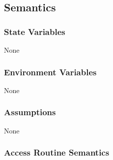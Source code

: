 \documentclass[12pt, titlepage]{article}
\begin{document}
\subsection{Semantics}

\subsubsection{State Variables}
None
 

\subsubsection{Environment Variables}

None

\subsubsection{Assumptions}

None

\subsubsection{Access Routine Semantics}
\end{document}
